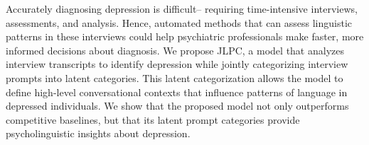 Accurately diagnosing depression is difficult-- requiring time-intensive interviews, assessments, and analysis. Hence, automated methods that can assess linguistic patterns in these interviews could help psychiatric professionals make faster, more informed decisions about diagnosis. We propose \textsc{JLPC}, a model that analyzes interview transcripts to identify depression while jointly categorizing interview prompts into latent categories. This latent categorization allows the model to define high-level conversational contexts that influence patterns of language in depressed individuals. We show that the proposed model not only outperforms competitive baselines, but that its latent prompt categories provide psycholinguistic insights about depression.

